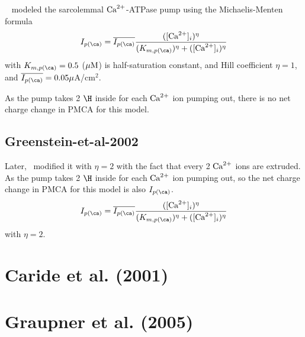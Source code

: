 ~\citep{jafri1998cad,winslow1999} modeled the sarcolemmal ${\text{Ca}^{2+}}$-ATPase pump
using the Michaelis-Menten formula
\begin{equation}
  \label{eq:1250}
  I_{p(\ca)} =
  \overline{I_{p(\ca)}}\frac{([\Ca]_i)^\eta}{(K_{m,p(\ca)})^\eta + ([\Ca]_i)^\eta}
\end{equation}
with $K_{m,p(\ca)}=0.5$ (${\mu\text{M}}$) is half-saturation constant, and Hill
coefficient $\eta = 1$, and $\overline{I_{p(\ca)}}=0.05\mu$A/cm$^2$.

As the pump takes 2 $\H$ inside for each ${\text{Ca}^{2+}}$ ion pumping out, there is no net
charge change in PMCA for this model.

\subsection{Greenstein-et-al-2002}

Later,~\citep{greenstein2002} modified it with $\eta =2$ with the fact that
every 2 ${\text{Ca}^{2+}}$ ions are extruded.
As the pump takes 2 $\H$ inside for each ${\text{Ca}^{2+}}$ ion pumping out, so the net
charge change in PMCA for this model is also $I_{p(\ca)}$.
\begin{equation}
  \label{eq:1250}
  I_{p(\ca)} =
  \overline{I_{p(\ca)}}\frac{([\Ca]_i)^\eta}{(K_{m,p(\ca)})^\eta + ([\Ca]_i)^\eta}
\end{equation}
with $\eta=2$.




\section{Caride et al. (2001)}


\section{Graupner et al. (2005)}
